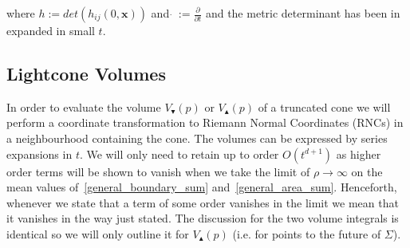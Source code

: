 \documentclass[12pt]{article}
\begin{document}
where $h:= det\left (h_{ij} (0,\mathbf{x})\right)$ and $\dot{}\: := \frac{\partial}{\partial t}$ and the metric determinant has been in expanded in small $t$.

\subsection{Lightcone Volumes}

In order to evaluate the volume $V_\blacktriangledown (p)$ or $V_\blacktriangle (p)$ of a truncated cone we will perform a coordinate transformation to Riemann Normal Coordinates (RNCs) in a neighbourhood containing the cone. The volumes can be expressed by series expansions in $t$. We will only need to retain up to order $O(t^{d+1})$ as higher order terms will be shown to vanish when we take the limit of $\rho\rightarrow\infty$ on the mean values of~\eqref{general_boundary_sum} and~\eqref{general_area_sum}. Henceforth, whenever we state that a term of some order vanishes in the limit we mean that it vanishes in the way just stated. The discussion for the two volume integrals is identical so we will only outline it for $V_\blacktriangle (p)$ (i.e. for points to the future of $\Sigma$).
\end{document}
